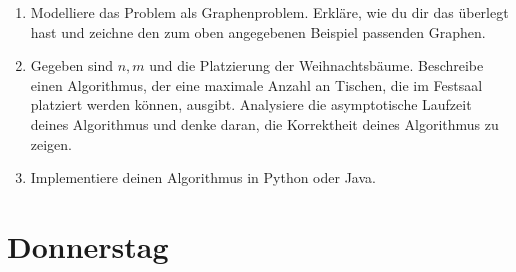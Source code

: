 \documentclass{uebung_cs}
\begin{document}
\begin{aufgabe}[Weihnachtsbäume]
    
    \vspace{4mm}
    \begin{enumerate}
    	\item Modelliere das Problem als Graphenproblem. Erkläre, wie du dir das überlegt hast und zeichne den zum oben angegebenen Beispiel passenden Graphen.\\
    	\item Gegeben sind $n,m$ und die Platzierung der Weihnachtsbäume. Beschreibe einen Algorithmus, der eine maximale Anzahl an Tischen, die im Festsaal platziert werden können, ausgibt. Analysiere die asymptotische Laufzeit deines Algorithmus und denke daran, die Korrektheit deines Algorithmus zu zeigen.\\
    	\item Implementiere deinen Algorithmus in Python oder Java.
    \end{enumerate}
\end{aufgabe}

\section*{Donnerstag}
\end{document}
